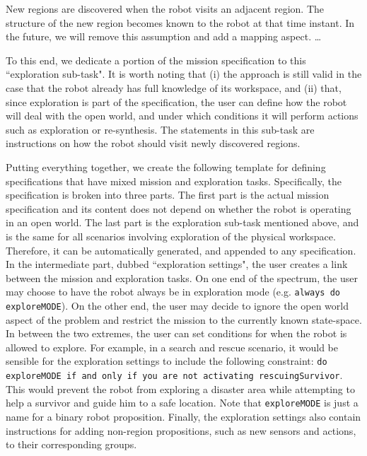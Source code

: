 \begin{myAssumption}
	New regions are discovered when the robot visits an adjacent region. The structure of the new region becomes known to the robot at that time instant. In the future, we will remove this assumption and add a mapping aspect. \ldots
\end{myAssumption}

To this end, we dedicate a portion of the mission specification to this ``exploration sub-task". It is worth noting that (i) the approach is still valid in the case that the robot already has full knowledge of its workspace, and (ii) that, since exploration is part of the specification, the user can define how the robot will deal with the open world, and under which conditions it will perform actions such as exploration or re-synthesis. The statements in this sub-task are instructions on how the robot should visit newly discovered regions.

Putting everything together, we create the following template for defining specifications that have mixed mission and exploration tasks. Specifically, the specification is broken into three parts. The first part is the actual mission specification and its content does not depend on whether the robot is operating in an open world. The last part is the exploration sub-task mentioned above, and is the same for all scenarios involving exploration of the physical workspace. Therefore, it can be automatically generated, and appended to any specification. In the intermediate part, dubbed ``exploration settings", the user creates a link between the mission and exploration tasks. On one end of the spectrum, the user may choose to have the robot always be in exploration mode (e.g. \texttt{always do exploreMODE}). On the other end, the user may decide to ignore the open world aspect of the problem and restrict the mission to the currently known state-space. In between the two extremes, the user can set conditions for when the robot is allowed to explore. For example, in a search and rescue scenario, it would be sensible for the exploration settings to include the following constraint: \texttt{do exploreMODE if and only if you are not activating rescuingSurvivor}. This would prevent the robot from exploring a disaster area while attempting to help a survivor and guide him to a safe location. Note that \texttt{exploreMODE} is just a name for a binary robot proposition. Finally, the exploration settings also contain instructions for adding non-region propositions, such as new sensors and actions, to their corresponding groups.

